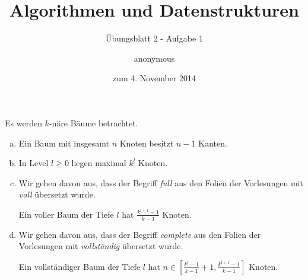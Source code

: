 \documentclass[a4paper]{scrartcl}
\title{Algorithmen und Datenstrukturen}
\subtitle{Übungsblatt 2 - Aufgabe 1}
\author{
    anonymous
}
\date{zum 4. November 2014}
\begin{document}
\maketitle

Es werden $k$-näre Bäume betrachtet.
\begin{enumerate}[(a)]
    \item
        Ein Baum mit insgesamt $n$ Knoten besitzt $n-1$ Kanten.
        
    \item
        In Level $l \geq 0$ liegen maximal $k^l$ Knoten.
        
    \item
        Wir gehen davon aus, dass der Begriff \emph{full} aus den Folien der
        Vorlesungen mit \emph{voll} übersetzt wurde.

        Ein voller Baum der Tiefe $l$ hat $\frac{k^{l+1}-1}{k-1}$ Knoten.
        
    \item
        Wir gehen davon aus, dass der Begriff \emph{complete} aus den Folien der
        Vorlesungen mit \emph{vollständig} übersetzt wurde.

        Ein vollständiger Baum der Tiefe $l$ hat $n \in \left[ \frac{k^l-1}{k-1}+1 , \frac{k^{l+1}-1}{k-1} \right]$ Knoten.
        
\end{enumerate}
\end{document}
